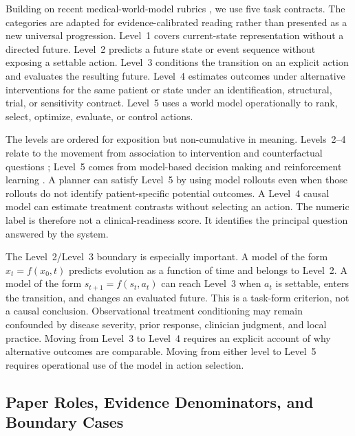 Building on recent medical-world-model rubrics \citep{Qazi2025BeyondGenerativeAI,Saeed2026MedicalWorldModel}, we use five task contracts. The categories are adapted for evidence-calibrated reading rather than presented as a new universal progression. Level~1 covers current-state representation without a directed future. Level~2 predicts a future state or event sequence without exposing a settable action. Level~3 conditions the transition on an explicit action and evaluates the resulting future. Level~4 estimates outcomes under alternative interventions for the same patient or state under an identification, structural, trial, or sensitivity contract. Level~5 uses a world model operationally to rank, select, optimize, evaluate, or control actions.

The levels are ordered for exposition but non-cumulative in meaning. Levels~2--4 relate to the movement from association to intervention and counterfactual questions \citep{Pearl2009Causality,PearlMackenzie2018BookOfWhy}; Level~5 comes from model-based decision making and reinforcement learning \citep{SuttonBarto2018Reinforcement,unknown2018WorldModels}. A planner can satisfy Level~5 by using model rollouts even when those rollouts do not identify patient-specific potential outcomes. A Level~4 causal model can estimate treatment contrasts without selecting an action. The numeric label is therefore not a clinical-readiness score. It identifies the principal question answered by the system.

The Level~2/Level~3 boundary is especially important. A model of the form $x_t=f(x_0,t)$ predicts evolution as a function of time and belongs to Level~2. A model of the form $s_{t+1}=f(s_t,a_t)$ can reach Level~3 when $a_t$ is settable, enters the transition, and changes an evaluated future. This is a task-form criterion, not a causal conclusion. Observational treatment conditioning may remain confounded by disease severity, prior response, clinician judgment, and local practice. Moving from Level~3 to Level~4 requires an explicit account of why alternative outcomes are comparable. Moving from either level to Level~5 requires operational use of the model in action selection.



\subsection{Paper Roles, Evidence Denominators, and Boundary Cases}

